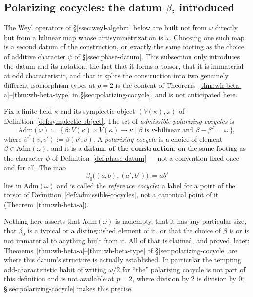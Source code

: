 
\subsection{Polarizing cocycles: the datum $\beta$, introduced}
\label{ssec:beta-introduced}

The Weyl operators of \S\ref{ssec:weyl-algebra} below are built not from
$\omega$ directly but from a bilinear map whose antisymmetrization is
$\omega$. Choosing one such map is a second datum of the construction, on
exactly the same footing as the choice of additive character
$\psi$ of \S\ref{ssec:phase-datum}. This subsection only introduces the
datum and its notation; the fact that it forms a torsor, that it is
immaterial at odd characteristic, and that it splits the construction into
two genuinely different isomorphism types at $p=2$ is the content of
Theorems~\ref{thm:wh-beta-a}--\ref{thm:wh-beta-type} in
\S\ref{sec:polarizing-cocycle}, and is not anticipated here.

\begin{definition}
\label{def:admissible-cocycles}
Fix a finite field $\kappa$ and its symplectic object $(V(\kappa),\omega)$ of
Definition~\ref{def:symplectic-object}. The set of \emph{admissible
polarizing cocycles} is
\[
\mathrm{Adm}(\omega) := \big\{\, \beta : V(\kappa)\times V(\kappa) \to \kappa
\ \big|\ \beta \text{ is $\kappa$-bilinear and } \beta - \beta^T = \omega
\,\big\},
\]
where $\beta^T(v,v') := \beta(v',v)$. A \emph{polarizing cocycle} is a choice
of element $\beta \in \mathrm{Adm}(\omega)$, and it is a \textbf{datum of the
construction}, on the same footing as the character $\psi$ of
Definition~\ref{def:phase-datum} — not a convention fixed once and for all.
The map
\[
\beta_0\big((a,b),(a',b')\big) := ab'
\]
lies in $\mathrm{Adm}(\omega)$ and is called the \emph{reference cocycle}: a
label for a point of the torsor of Definition~\ref{def:admissible-cocycles},
not a canonical point of it (Theorem~\ref{thm:wh-beta-a}).
\end{definition}

\begin{scope}
Nothing here asserts that $\mathrm{Adm}(\omega)$ is nonempty, that it has any
particular size, that $\beta_0$ is a typical or a distinguished element of
it, or that the choice of $\beta$ is or is not immaterial to anything built
from it. All of that is claimed, and proved, later:
Theorems~\ref{thm:wh-beta-a}--\ref{thm:wh-beta-type} of
\S\ref{sec:polarizing-cocycle} are where this datum's structure is actually
established. In particular the tempting
odd-characteristic habit of writing $\omega/2$ for ``the'' polarizing cocycle
is not part of this definition and is not available at $p=2$, where division
by $2$ is division by $0$; \S\ref{sec:polarizing-cocycle} makes this
precise.
\end{scope}

